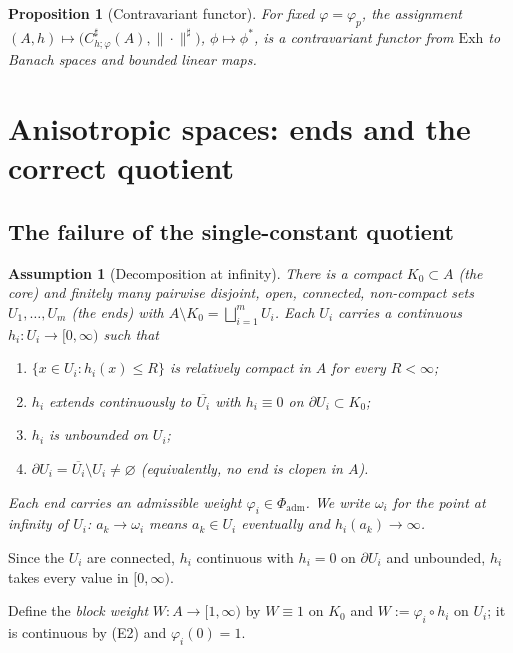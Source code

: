 \documentclass[11pt,a4paper]{article}
\numberwithin{equation}{section}
\theoremstyle{plain}
\newtheorem{proposition}[theorem]{Proposition}
\newtheorem{assumption}[theorem]{Assumption}
\theoremstyle{definition}
\theoremstyle{remark}
\begin{document}
\begin{proposition}[Contravariant functor]\label{prop:functor}
For fixed $\varphi=\varphi_p$, the assignment
$(A,h)\mapsto\bigl(C^{\sharp}_{h;\varphi}(A),\|\cdot\|^{\sharp}\bigr)$,
$\phi\mapsto\phi^{\ast}$, is a contravariant functor from $\mathrm{Exh}$ to Banach spaces
and bounded linear maps.
\end{proposition}

\section{Anisotropic spaces: ends and the correct quotient}
\label{sec:ends}

\subsection{The failure of the single-constant quotient}

\begin{assumption}[Decomposition at infinity]\label{ass:ends}
There is a compact $K_0\subset A$ (the \emph{core}) and finitely many pairwise disjoint,
open, connected, non-compact sets $U_1,\dots,U_m$ (the \emph{ends}) with
$A\setminus K_0=\bigsqcup_{i=1}^{m}U_i$. Each $U_i$ carries a continuous
$h_i:U_i\to[0,\infty)$ such that
\begin{enumerate}
\item[(E1)] $\{x\in U_i:h_i(x)\le R\}$ is relatively compact in $A$ for every $R<\infty$;
\item[(E2)] $h_i$ extends continuously to $\overline{U_i}$ with $h_i\equiv0$ on
$\partial U_i\subset K_0$;
\item[(E3)] $h_i$ is unbounded on $U_i$;
\item[(E4)] $\partial U_i=\overline{U_i}\setminus U_i\ne\varnothing$ (equivalently, no end
is clopen in $A$).
\end{enumerate}
Each end carries an admissible weight $\varphi_i\in\Phi_{\mathrm{adm}}$. We write
$\omega_i$ for the point at infinity of $U_i$: $a_k\to\omega_i$ means
$a_k\in U_i$ eventually and $h_i(a_k)\to\infty$.
\end{assumption}

Since the $U_i$ are connected, $h_i$ continuous with $h_i=0$ on $\partial U_i$ and
unbounded, $h_i$ takes every value in $[0,\infty)$.

Define the \emph{block weight} $W:A\to[1,\infty)$ by $W\equiv1$ on $K_0$ and
$W:=\varphi_i\circ h_i$ on $U_i$; it is continuous by (E2) and $\varphi_i(0)=1$.
\end{document}
